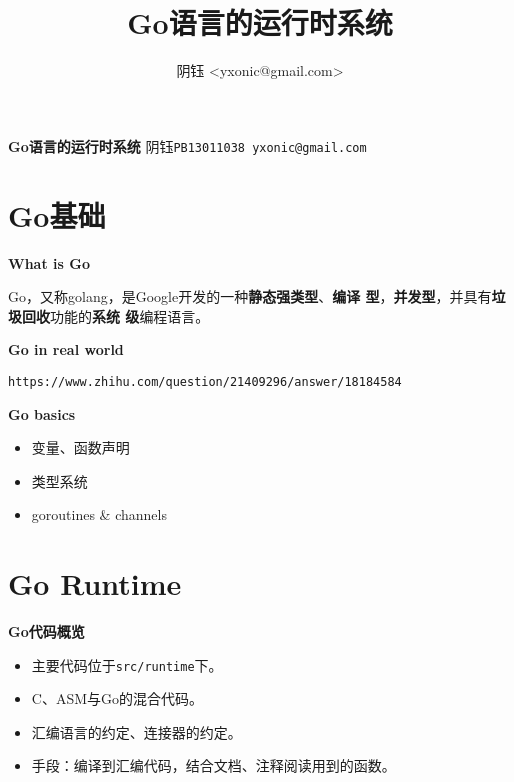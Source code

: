 \documentclass{beamer}
\title{Go语言的运行时系统}
\author{阴钰 <yxonic@gmail.com>}
\date{}
\begin{document}
\begin{frame}
  \vfill
  \quad\textbf{\Huge Go语言的运行时系统}
  \vfill
  \quad 阴\quad 钰\quad \texttt{PB13011038 \scriptsize yxonic@gmail.com}
\end{frame}

\section{Go基础}

\begin{frame}{\bf What is Go}

  Go，又称golang，是Google开发的一种\textbf{静态强类型}、\textbf{编译
    型}，\textbf{并发型}，并具有\textbf{垃圾回收}功能的\textbf{系统
    级}编程语言。

\end{frame}

\begin{frame}{\bf Go in real world}

\texttt{https://www.zhihu.com/question/21409296/answer/18184584}
  
\end{frame}

\begin{frame}{\bf Go basics}
  \begin{itemize}
  \item 变量、函数声明
  \item 类型系统
  \item goroutines \& channels
  \end{itemize}
\end{frame}

\section{Go Runtime}

\begin{frame}{\bf Go代码概览}

\begin{itemize}
\pause
\item 主要代码位于\texttt{src/runtime}下。
\pause
\item C、ASM与Go的混合代码。
\pause
\item 汇编语言的约定、连接器的约定。
\pause
\item 手段：编译到汇编代码，结合文档、注释阅读用到的函数。
\end{itemize}

\end{frame}
\end{document}
